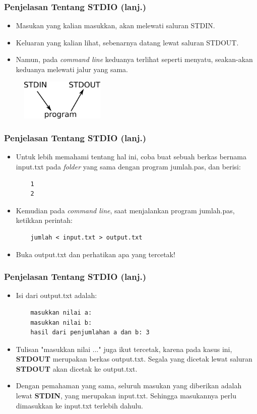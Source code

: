 \begin{frame}
\frametitle{Penjelasan Tentang STDIO (lanj.)}
\begin{itemize}
  \item Masukan yang kalian masukkan, akan melewati saluran STDIN.
  \item Keluaran yang kalian lihat, sebenarnya datang lewat saluran STDOUT.
  \item Namun, pada \textit{command line} keduanya terlihat seperti menyatu, seakan-akan keduanya melewati jalur yang sama.
\end{itemize}
\begin{figure}
  \includegraphics[width=4cm]{asset/g1.png}
\end{figure}
\end{frame}

\begin{frame}[fragile]
\frametitle{Penjelasan Tentang STDIO (lanj.)}
\begin{itemize}
  \item Untuk lebih memahami tentang hal ini, coba buat sebuah berkas bernama input.txt pada \textit{folder} yang sama dengan program jumlah.pas, dan berisi:
  \begin{lstlisting}
    1
    2
  \end{lstlisting}
  \item Kemudian pada \textit{command line}, saat menjalankan program jumlah.pas, ketikkan perintah:
  \begin{lstlisting}
    jumlah < input.txt > output.txt
  \end{lstlisting}
  \item Buka output.txt dan perhatikan apa yang tercetak!
\end{itemize}
\end{frame}

\begin{frame}[fragile]
\frametitle{Penjelasan Tentang STDIO (lanj.)}
\begin{itemize}
  \item Isi dari output.txt adalah:
  \begin{lstlisting}
    masukkan nilai a:
    masukkan nilai b:
    hasil dari penjumlahan a dan b: 3
  \end{lstlisting}
  \item Tulisan "masukkan nilai ..." juga ikut tercetak, karena pada kasus ini, \textbf{STDOUT} merupakan berkas output.txt. Segala yang dicetak lewat saluran \textbf{STDOUT} akan dicetak ke output.txt.
  \item Dengan pemahaman yang sama, seluruh masukan yang diberikan adalah lewat \textbf{STDIN}, yang merupakan input.txt. Sehingga masukannya perlu dimasukkan ke input.txt terlebih dahulu.
\end{itemize}
\end{frame}

